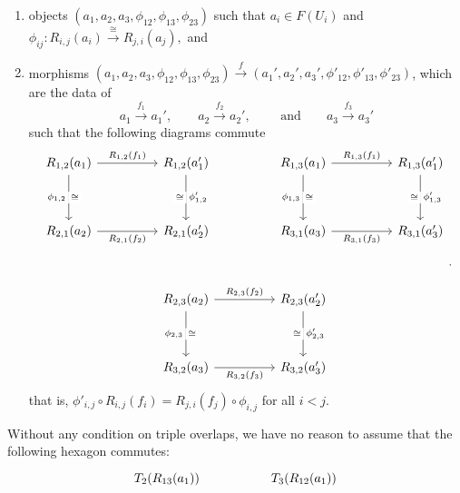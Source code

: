 \begin{example}
\begin{enumerate}
    \item objects \( (a_1,a_2,a_3,\phi_{12},\phi_{13},\phi_{23}) \) such that \( a_i \in F(U_i)\) and
    \( \phi_{ij}: R_{i,j}(a_i) \xrightarrow{\cong} R_{j,i}(a_j), \) and
    \item morphisms \( (a_1,a_2,a_3,\phi_{12},\phi_{13},\phi_{23}) \xrightarrow{f} (a_1',a_2',a_3',\phi'_{12},\phi'_{13},\phi'_{23}) \), which are the data of
    \[ a_1 \xrightarrow{f_1} a_1', \qquad a_2 \xrightarrow{f_2} a_2', \qquad \text{ and} \qquad a_3 \xrightarrow{f_3} a_3' \]
    such that the following diagrams commute
    \[\begin{tikzcd}
    	{R_{1,2}(a_1)} && {R_{1,2}(a_1')} && {R_{1,3}(a_1)} && {R_{1,3}(a_1')} \\
    	\\
    	{R_{2,1}(a_2)} && {R_{2,1}(a_2')} && {R_{3,1}(a_3)} && {R_{3,1}(a_3')} \\
    	\\
    	&& {R_{2,3}(a_2)} && {R_{2,3}(a_2')} \\
    	\\
    	&& {R_{3,2}(a_3)} && {R_{3,2}(a_3')}
    	\arrow["{R_{1,2}(f_1)}", from=1-1, to=1-3]
    	\arrow["{\phi_{1,2}}"', from=1-1, to=3-1]
    	\arrow["\cong"{description}, shift left=2, draw=none, from=1-1, to=3-1]
    	\arrow["{\phi'_{1,2}}", from=1-3, to=3-3]
    	\arrow["\cong"{description}, shift right=2, draw=none, from=1-3, to=3-3]
    	\arrow["{R_{1,3}(f_1)}", from=1-5, to=1-7]
    	\arrow["{\phi_{1,3}}"', from=1-5, to=3-5]
    	\arrow["\cong"{description}, shift left=2, draw=none, from=1-5, to=3-5]
    	\arrow["{\phi'_{1,3}}", from=1-7, to=3-7]
    	\arrow["\cong"{description}, shift right=2, draw=none, from=1-7, to=3-7]
    	\arrow["{R_{2,1}(f_2)}"', from=3-1, to=3-3]
    	\arrow["{R_{3,1}(f_3)}"', from=3-5, to=3-7]
    	\arrow["{R_{2,3}(f_2)}", from=5-3, to=5-5]
    	\arrow["{\phi_{2,3}}"', from=5-3, to=7-3]
    	\arrow["\cong"{description}, shift left=2, draw=none, from=5-3, to=7-3]
    	\arrow["{\phi'_{2,3}}", from=5-5, to=7-5]
    	\arrow["\cong"{description}, shift right=2, draw=none, from=5-5, to=7-5]
    	\arrow["{R_{3,2}(f_3)}"', from=7-3, to=7-5]
    \end{tikzcd}.\]
    that is, \(\phi'_{i,j} \circ R_{i,j}(f_i) = R_{j,i}(f_j) \circ \phi_{i,j} \) for all $i < j$.
\end{enumerate}
Without any condition on triple overlaps, we have no reason to assume that the following hexagon commutes:
\[\begin{tikzcd}
    & {T_2(R_{13}(a_1))} && {T_3(R_{12}(a_1))} & \\

\end{tikzcd}\]
\end{example}
